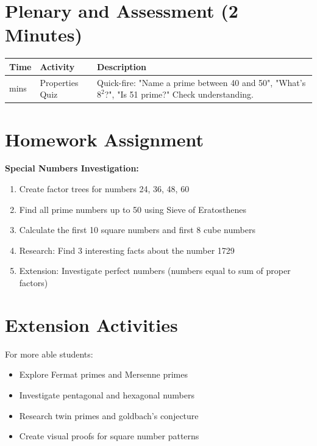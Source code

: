 \documentclass{article}
\begin{document}
\section{Plenary and Assessment (2 Minutes)}

\begin{tabularx}{\textwidth}{|>{\raggedright\arraybackslash}p{1cm}|>{\raggedright\arraybackslash}p{3cm}|>{\raggedright\arraybackslash}X|}
\hline
\textbf{Time} & \textbf{Activity} & \textbf{Description} \\
\hline
2 mins & Properties Quiz & Quick-fire: "Name a prime between 40 and 50", "What's $8^2$?", "Is 51 prime?" Check understanding. \\
\hline
\end{tabularx}

\section{Homework Assignment}

\textbf{Special Numbers Investigation:}
\begin{enumerate}
    \item Create factor trees for numbers 24, 36, 48, 60
    \item Find all prime numbers up to 50 using Sieve of Eratosthenes
    \item Calculate the first 10 square numbers and first 8 cube numbers
    \item Research: Find 3 interesting facts about the number 1729
    \item Extension: Investigate perfect numbers (numbers equal to sum of proper factors)
\end{enumerate}

\section{Extension Activities}

For more able students:
\begin{itemize}
    \item Explore Fermat primes and Mersenne primes
    \item Investigate pentagonal and hexagonal numbers
    \item Research twin primes and goldbach's conjecture
    \item Create visual proofs for square number patterns
\end{itemize}

\newpage
\end{document}
